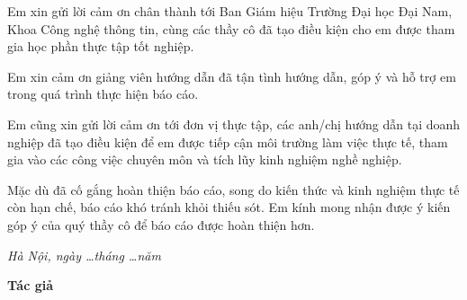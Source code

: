 
Em xin gửi lời cảm ơn chân thành tới Ban Giám hiệu Trường Đại học Đại Nam, Khoa Công nghệ thông tin, cùng các thầy cô đã tạo điều kiện cho em được tham gia học phần thực tập tốt nghiệp.

Em xin cảm ơn giảng viên hướng dẫn \GiangVienHD{} đã tận tình hướng dẫn, góp ý và hỗ trợ em trong quá trình thực hiện báo cáo.

Em cũng xin gửi lời cảm ơn tới đơn vị thực tập, các anh/chị hướng dẫn tại doanh nghiệp đã tạo điều kiện để em được tiếp cận môi trường làm việc thực tế, tham gia vào các công việc chuyên môn và tích lũy kinh nghiệm nghề nghiệp.

Mặc dù đã cố gắng hoàn thiện báo cáo, song do kiến thức và kinh nghiệm thực tế còn hạn chế, báo cáo khó tránh khỏi thiếu sót. Em kính mong nhận được ý kiến góp ý của quý thầy cô để báo cáo được hoàn thiện hơn.

\vspace{1cm}

\begin{flushright}
\begin{minipage}{8cm}
\centering
\textit{Hà Nội, ngày \ldots tháng \ldots năm \Nam}

\vspace{0.5cm}

\textbf{Tác giả}

\vspace{2cm}

\textbf{\TenSinhVien}
\end{minipage}
\end{flushright}
